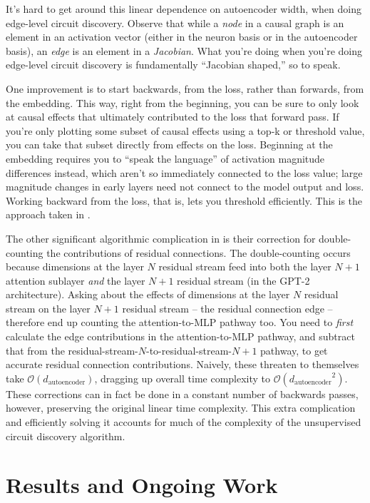 \documentclass[10pt]{article}
\begin{document}
It's hard to get around this linear dependence on autoencoder width, when doing edge-level circuit discovery. Observe that while a \textit{node} in a causal graph is an element in an activation vector (either in the neuron basis or in the autoencoder basis), an \textit{edge} is an element in a \textit{Jacobian}. What you're doing when you're doing edge-level circuit discovery is fundamentally ``Jacobian shaped,'' so to speak.

One improvement is to start backwards, from the loss, rather than forwards, from the embedding. This way, right from the beginning, you can be sure to only look at causal effects that ultimately contributed to the loss that forward pass. If you're only plotting some subset of causal effects using a top-k or threshold value, you can take that subset directly from effects on the loss. Beginning at the embedding requires you to ``speak the language'' of activation magnitude differences instead, which aren't so immediately connected to the loss value; large magnitude changes in early layers need not connect to the model output and loss. Working backward from the loss, that is, lets you threshold efficiently. This is the approach taken in \citet{Marks2024}.

The other significant algorithmic complication in \citet{Marks2024} is their correction for double-counting the contributions of residual connections. The double-counting occurs because dimensions at the layer $N$ residual stream feed into both the layer $N+1$ attention sublayer \textit{and} the layer $N+1$ residual stream (in the GPT-2 architecture). Asking about the effects of dimensions at the layer $N$ residual stream on the layer $N+1$ residual stream -- the residual connection edge -- therefore end up counting the attention-to-MLP pathway too. You need to \textit{first} calculate the edge contributions in the attention-to-MLP pathway, and subtract that from the residual-stream-$N$-to-residual-stream-$N+1$ pathway, to get accurate residual connection contributions. Naively, these threaten to themselves take $\mathcal{O}(d_\text{autoencoder})$, dragging up overall time complexity to $\mathcal{O}({d_\text{autoencoder}}^2)$. These corrections can in fact be done in a constant number of backwards passes, however, preserving the original linear time complexity. This extra complication and efficiently solving it accounts for much of the complexity of the unsupervised circuit discovery algorithm.

\section{Results and Ongoing Work}
\end{document}
